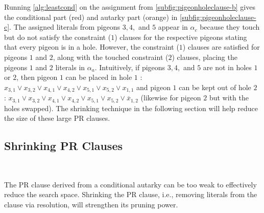 Running \autoref{alg:leastcond} on the assignment from
\autoref{subfig:pigeonholeclause-b}  
gives the conditional part (red) and autarky part (orange) in
\autoref{subfig:pigeonholeclause-c}. The assigned literals from pigeons $3,4,$
and $5$ appear in $\alpha_c$ because they touch but do not satisfy the
constraint ($1$) clauses for the respective pigeons stating that every pigeon is
in a hole. However, the constraint ($1$) clauses are satisfied for pigeons $1$
and $2$, along with the touched constraint ($2$) clauses, placing the pigeons
$1$ and $2$ literals in $\alpha_a$. Intuitively, if pigeons $3,4,$ and $5$ are
not in holes $1$ or $2$, then pigeon $1$ can be placed in hole $1$ : $x_{3,1}
\lor x_{3,2} \lor x_{4,1} \lor x_{4,2} \lor x_{5,1} \lor x_{5,2} \lor x_{1,1} $
and pigeon $1$ can be kept out of hole $2$ : $x_{3,1} \lor x_{3,2} \lor x_{4,1}
\lor x_{4,2} \lor x_{5,1} \lor x_{5,2} \lor \overline{x}_{1,2} $ (likewise for
pigeon $2$ but with the holes swapped). 
The shrinking technique in the following section will help reduce the size of
these large PR clauses. 



\subsection{Shrinking PR Clauses}~\label{subsec:shrinking}

The PR clause derived from a conditional autarky can be too weak to effectively
reduce the search space.
Shrinking the PR clause, i.e., removing literals from the clause via
resolution, will strengthen its pruning power. 

